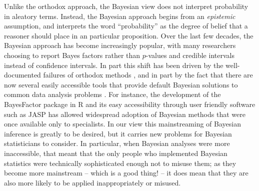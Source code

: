 \documentclass[doc]{apa6}
\begin{document}
Unlike the orthodox approach, the Bayesian view does not interpret probability in aleatory terms. Instead, the Bayesian approach begins from an {\it epistemic} assumption, and interprets the word ``probability'' as the degree of belief that a       reasoner should place in an particular proposition. Over the last few decades, the Bayesian approach has become increasingly popular, with many researchers choosing to report Bayes factors rather than $p$-values and credible intervals instead of confidence intervals. In part this shift has been driven by the well-documented failures of orthodox methods \parencite{wagenmakers_practical_2007}, and in part by the fact that there are now several easily accessible tools that provide default Bayesian solutions to common data analysis problems \parencites[  for a default t-distribution model see][  online version;  \url{http://www.sumsar.net/best_online/}]{BESTpackage}. For instance, the development of the BayesFactor package in R \parencite{Morey_2015_BF} and its easy accessibility through user friendly software such as JASP \parencite{jasp_2016} has allowed widespread adoption of Bayesian methods that were once available only to specialists. In our view this mainstreaming of Bayesian inference is greatly to be desired, but it carries new problems for Bayesian statisticians to consider.   In particular, when Bayesian analyses were more inaccessible, that meant that the only people who implemented Bayesian statistics were technically sophisticated enough not to misuse them; as they become more mainstream -- which is a good thing! -- it does mean that they are also more likely to be applied inappropriately or misused.
\end{document}
